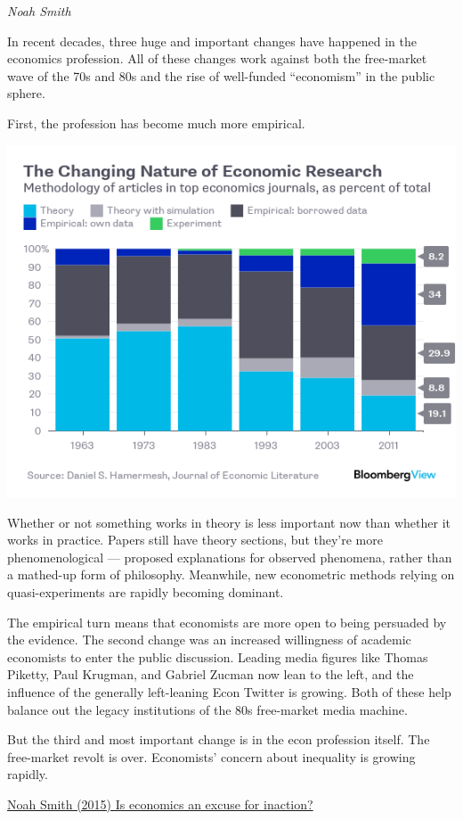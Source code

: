 \documentclass[
]{book}
\begin{document}
\emph{Noah Smith}

In recent decades, three huge and important changes have happened in the economics profession. All of these changes work against both the free-market wave of the 70s and 80s and the rise of well-funded ``economism'' in the public sphere.

First, the profession has become much more empirical.

\includegraphics{fig/economics_research_agenda.png}

Whether or not something works in theory is less important now than whether it works in practice. Papers still have theory sections, but they're more phenomenological --- proposed explanations for observed phenomena, rather than a mathed-up form of philosophy. Meanwhile, new econometric methods relying on quasi-experiments are rapidly becoming dominant.

The empirical turn means that economists are more open to being persuaded by the evidence.
The second change was an increased willingness of academic economists to enter the public discussion. Leading media figures like Thomas Piketty, Paul Krugman, and Gabriel Zucman now lean to the left, and the influence of the generally left-leaning Econ Twitter is growing. Both of these help balance out the legacy institutions of the 80s free-market media machine.

But the third and most important change is in the econ profession itself. The free-market revolt is over. Economists' concern about inequality is growing rapidly.

\href{https://noahpinion.substack.com/p/is-economics-an-excuse-for-inaction}{Noah Smith (2015) Is economics an excuse for inaction?}
\end{document}

